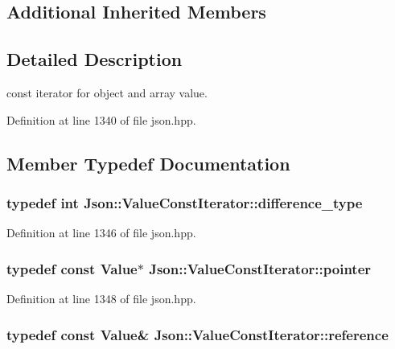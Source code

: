 \subsection*{Additional Inherited Members}


\subsection{Detailed Description}
const iterator for object and array value. 



Definition at line 1340 of file json.\-hpp.



\subsection{Member Typedef Documentation}
\hypertarget{class_json_1_1_value_const_iterator_a32b36aa9d76e2b48ca74fb6e1979a95a}{
\subsubsection[{difference\-\_\-type}]{\setlength{\rightskip}{0pt plus 5cm}typedef int {\bf Json\-::\-Value\-Const\-Iterator\-::difference\-\_\-type}}}\label{class_json_1_1_value_const_iterator_a32b36aa9d76e2b48ca74fb6e1979a95a}


Definition at line 1346 of file json.\-hpp.

\hypertarget{class_json_1_1_value_const_iterator_a400136bd8bc09e9fddec0785fa2cff14}{
\subsubsection[{pointer}]{\setlength{\rightskip}{0pt plus 5cm}typedef const {\bf Value}$\ast$ {\bf Json\-::\-Value\-Const\-Iterator\-::pointer}}}\label{class_json_1_1_value_const_iterator_a400136bd8bc09e9fddec0785fa2cff14}


Definition at line 1348 of file json.\-hpp.

\hypertarget{class_json_1_1_value_const_iterator_aa9b05c6a37cd352ea1ee6e13b816f709}{
\subsubsection[{reference}]{\setlength{\rightskip}{0pt plus 5cm}typedef const {\bf Value}\& {\bf Json\-::\-Value\-Const\-Iterator\-::reference}}}\label{class_json_1_1_value_const_iterator_aa9b05c6a37cd352ea1ee6e13b816f709}


